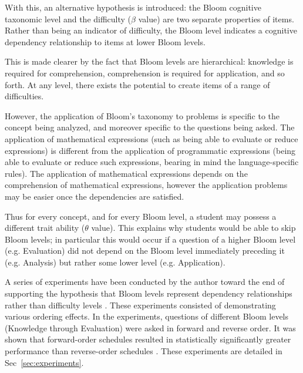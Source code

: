 With this, an alternative hypothesis is introduced: the Bloom cognitive
taxonomic level and the difficulty ($\beta$ value) are two separate properties
of items. Rather than being an indicator of difficulty, the Bloom level
indicates a cognitive dependency relationship to items at lower Bloom levels.

This is made clearer by the fact that Bloom levels are hierarchical: knowledge
is required for comprehension, comprehension is required for application, and
so forth.  At any level, there exists the potential to create items of a
range of difficulties. 

However, the application of Bloom's taxonomy to problems is specific to the
concept being analyzed, and moreover specific to the questions being asked.
The application of mathematical expressions (such as being able to evaluate or
reduce expressions) is different from the application of programmatic
expressions (being able to evaluate or reduce such expressions, bearing in mind
the language-specific rules).  The application of mathematical expressions
depends on the comprehension of mathematical expressions, however the
application problems may be easier once the dependencies are satisfied. 

Thus for every concept, and for every Bloom level, a student may possess a
different trait ability ($\theta$ value).  This explains why students would be
able to skip Bloom levels; in particular this would occur if a question of a
higher Bloom level (e.g. Evaluation) did not depend on the Bloom level
immediately preceding it (e.g. Analysis) but rather some lower level (e.g.
Application).  

A series of experiments have been conducted by the author toward the end of
supporting the hypothesis that Bloom levels represent dependency relationships
rather than difficulty levels \cite{castleberry2016}.  These experiments
consisted of demonstrating various ordering effects.  In the experiments,
questions of different Bloom levels (Knowledge through Evaluation) were asked
in forward and reverse order.  It was shown that forward-order schedules
resulted in statistically significantly greater performance than reverse-order
schedules \cite{castleberry2016}.   These experiments are detailed in
Sec~\ref{sec:experiments}.

